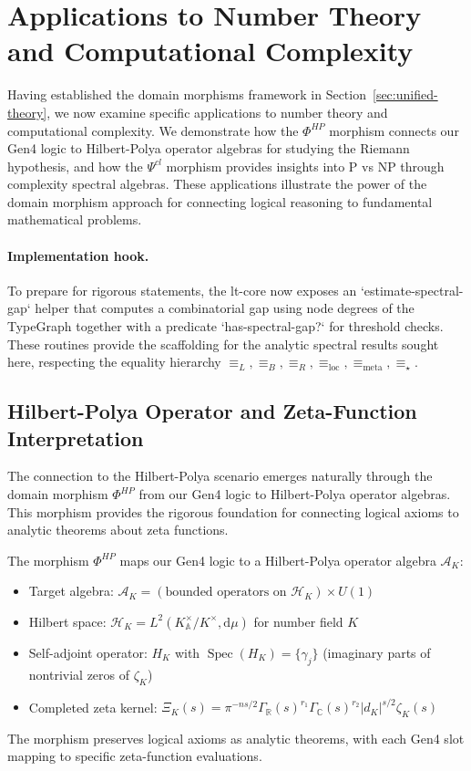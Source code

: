 \section{Applications to Number Theory and Computational Complexity}
\label{sec:spectral-gap}

Having established the domain morphisms framework in Section~\ref{sec:unified-theory}, we now examine specific applications to number theory and computational complexity. We demonstrate how the $\Phi^{HP}$ morphism connects our Gen4 logic to Hilbert-Polya operator algebras for studying the Riemann hypothesis, and how the $\Psi^{cl}$ morphism provides insights into P vs NP through complexity spectral algebras. These applications illustrate the power of the domain morphism approach for connecting logical reasoning to fundamental mathematical problems.

\paragraph{Implementation hook.} To prepare for rigorous statements, the lt-core now exposes an `estimate-spectral-gap` helper that computes a combinatorial gap using node degrees of the TypeGraph together with a predicate `has-spectral-gap?` for threshold checks. These routines provide the scaffolding for the analytic spectral results sought here, respecting the equality hierarchy $\equiv_L, \equiv_B, \equiv_R, \equiv_{\text{loc}}, \equiv_{\text{meta}}, \equiv_\star$.

\subsection{Hilbert-Polya Operator and Zeta-Function Interpretation}

The connection to the Hilbert-Polya scenario emerges naturally through the domain morphism $\Phi^{HP}$ from our Gen4 logic to Hilbert-Polya operator algebras. This morphism provides the rigorous foundation for connecting logical axioms to analytic theorems about zeta functions.

\begin{definition}
\label{def:hilbert-polya-morphism}
The morphism $\Phi^{HP}$ maps our Gen4 logic to a Hilbert-Polya operator algebra $\mathscr{A}_K$:
\begin{itemize}
\item Target algebra: $\mathscr{A}_K = (\text{bounded operators on } \mathcal{H}_K) \times U(1)$
\item Hilbert space: $\mathcal{H}_K = L^2(K_{\mathbb{A}}^\times / K^\times, \mathrm{d}\mu)$ for number field $K$
\item Self-adjoint operator: $H_K$ with $\operatorname{Spec}(H_K) = \{\gamma_j\}$ (imaginary parts of nontrivial zeros of $\zeta_K$)
\item Completed zeta kernel: $\Xi_K(s) = \pi^{-ns/2} \Gamma_{\mathbb{R}}(s)^{r_1} \Gamma_{\mathbb{C}}(s)^{r_2} |d_K|^{s/2} \zeta_K(s)$
\end{itemize}
The morphism preserves logical axioms as analytic theorems, with each Gen4 slot mapping to specific zeta-function evaluations.
\end{definition}

